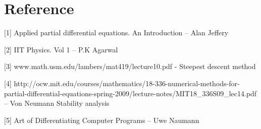 \documentclass[10pt,a4paper]{report}
\begin{document}
\chapter*{Reference}






\hspace*{\parindent}[1] Applied partial differential equations. An Introduction – Alan Jeffery

[2] IIT Physics. Vol 1 – P.K Agarwal

[3] www.math.usm.edu/lambers/mat419/lecture10.pdf -  Steepest descent method

[4] http://ocw.mit.edu/courses/mathematics/18-336-numerical-methods-for-partial-differential-equations-spring-2009/lecture-notes/MIT18\_336S09\_lec14.pdf – Von Neumann Stability analysis

[5] Art of Differentiating Computer Programs – Uwe Naumann



%
%  
%
%
%
%  

\end{document}
